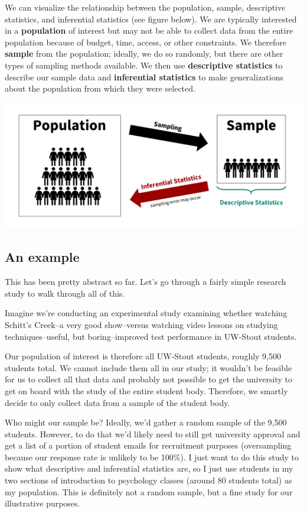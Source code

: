 \documentclass[
]{book}
\begin{document}
We can visualize the relationship between the population, sample, descriptive statistics, and inferential statistics (see figure below). We are typically interested in a \textbf{population} of interest but may not be able to collect data from the entire population because of budget, time, access, or other constraints. We therefore \textbf{sample} from the population; ideally, we do so randomly, but there are other types of sampling methods available. We then use \textbf{descriptive statistics} to describe our sample data and \textbf{inferential statistics} to make generalizations about the population from which they were selected.

\includegraphics{images/02-stats-foundations/descriptive-vs-inferential.png}

\hypertarget{an-example}{%
\subsection{An example}\label{an-example}}

This has been pretty abstract so far. Let's go through a fairly simple research study to walk through all of this.

Imagine we're conducting an experimental study examining whether watching Schitt's Creek--a very good show--versus watching video lessons on studying techniques--useful, but boring--improved test performance in UW-Stout students.

Our population of interest is therefore all UW-Stout students, roughly 9,500 students total. We cannot include them all in our study; it wouldn't be feasible for us to collect all that data and probably not possible to get the university to get on board with the study of the entire student body. Therefore, we smartly decide to only collect data from a sample of the student body.

Who might our sample be? Ideally, we'd gather a random sample of the 9,500 students. However, to do that we'd likely need to still get university approval and get a list of a portion of student emails for recruitment purposes (oversampling because our response rate is unlikely to be 100\%). I just want to do this study to show what descriptive and inferential statistics are, so I just use students in my two sections of introduction to psychology classes (around 80 students total) as my population. This is definitely not a random sample, but a fine study for our illustrative purposes.
\end{document}
